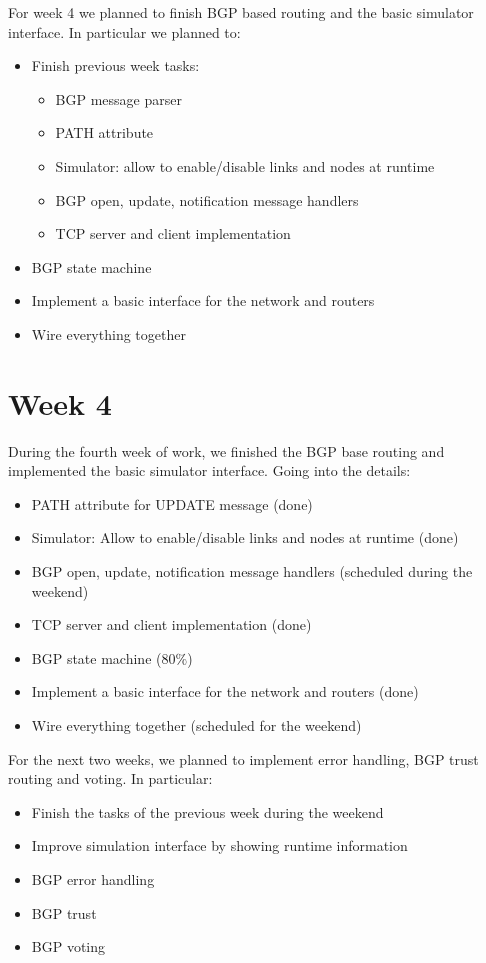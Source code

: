 For week 4 we planned to finish BGP based routing and the basic simulator interface.
In particular we planned to:
\begin{itemize}
 \item Finish previous week tasks:
 \begin{itemize}
 \item BGP message parser
 \item PATH attribute
 \item Simulator: allow to enable/disable links and nodes at runtime
 \item BGP open, update, notification message handlers
 \item TCP server and client implementation
 \end{itemize}
 \item BGP state machine
 \item Implement a basic interface for the network and routers
 \item Wire everything together
\end{itemize}

\section{Week 4}
During the fourth week of work, we finished the BGP base routing and implemented the basic simulator interface. Going into the details:
\begin{itemize}
 \item PATH attribute for UPDATE message (done)
 \item Simulator: Allow to enable/disable links and nodes at runtime (done)
 \item BGP open, update, notification message handlers (scheduled during the weekend)
 \item TCP server and client implementation (done)
 \item BGP state machine ($80\%$)
 \item Implement a basic interface for the network and routers (done)
 \item Wire everything together (scheduled for the weekend)
\end{itemize}

For the next two weeks, we planned to implement error handling, BGP trust routing and voting. In particular:
\begin{itemize}
 \item Finish the tasks of the previous week during the weekend
 \item Improve simulation interface by showing runtime information
 \item BGP error handling
 \item BGP trust
 \item BGP voting
\end{itemize}


